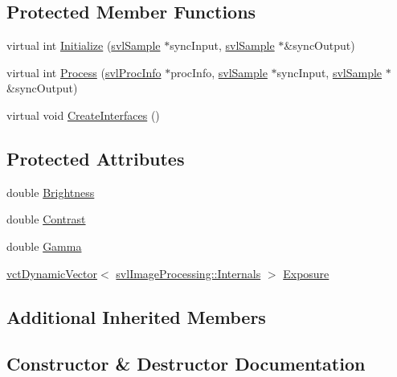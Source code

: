 \subsection*{Protected Member Functions}
\begin{DoxyCompactItemize}
\item 
virtual int \hyperlink{classsvl_filter_image_exposure_correction_abdc44ef630e2469191dd3ab612f99838}{Initialize} (\hyperlink{classsvl_sample}{svl\+Sample} $\ast$sync\+Input, \hyperlink{classsvl_sample}{svl\+Sample} $\ast$\&sync\+Output)
\item 
virtual int \hyperlink{classsvl_filter_image_exposure_correction_ab47687ddddbdcd976cfcd2fdd37aa157}{Process} (\hyperlink{structsvl_proc_info}{svl\+Proc\+Info} $\ast$proc\+Info, \hyperlink{classsvl_sample}{svl\+Sample} $\ast$sync\+Input, \hyperlink{classsvl_sample}{svl\+Sample} $\ast$\&sync\+Output)
\item 
virtual void \hyperlink{classsvl_filter_image_exposure_correction_af45aa60ce8ea8bae41bdd3517eb0f35d}{Create\+Interfaces} ()
\end{DoxyCompactItemize}
\subsection*{Protected Attributes}
\begin{DoxyCompactItemize}
\item 
double \hyperlink{classsvl_filter_image_exposure_correction_adc6d7d11d473e8cfc11aaedb397c3a44}{Brightness}
\item 
double \hyperlink{classsvl_filter_image_exposure_correction_a9dea6bb5e12150a39cc0c68b7688a099}{Contrast}
\item 
double \hyperlink{classsvl_filter_image_exposure_correction_a0bda9bde283f1fd9dc89780fc38f5eeb}{Gamma}
\item 
\hyperlink{classvct_dynamic_vector}{vct\+Dynamic\+Vector}$<$ \hyperlink{classsvl_image_processing_1_1_internals}{svl\+Image\+Processing\+::\+Internals} $>$ \hyperlink{classsvl_filter_image_exposure_correction_ad9a373e1d45905e9ce684d07985f5b41}{Exposure}
\end{DoxyCompactItemize}
\subsection*{Additional Inherited Members}


\subsection{Constructor \& Destructor Documentation}
\hypertarget{classsvl_filter_image_exposure_correction_acd892bb66f257297e11518d2b93706b1}{}
